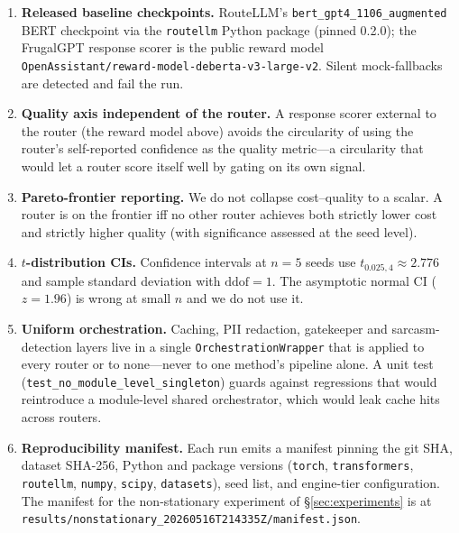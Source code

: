 \documentclass[11pt]{article}
\theoremstyle{definition}
\begin{document}
\begin{enumerate}[leftmargin=*, itemsep=1pt, topsep=2pt]
\item \textbf{Released baseline checkpoints.}
RouteLLM's \texttt{bert\_gpt4\_1106\_augmented} BERT checkpoint via the
\texttt{routellm} Python package (pinned 0.2.0); the FrugalGPT response
scorer is the public reward model
\texttt{OpenAssistant/reward-model-deberta-v3-large-v2}. Silent
mock-fallbacks are detected and fail the run.

\item \textbf{Quality axis independent of the router.}
A response scorer external to the router (the reward model above) avoids
the circularity of using the router's self-reported confidence as the
quality metric---a circularity that would let a router score itself well
by gating on its own signal.

\item \textbf{Pareto-frontier reporting.}
We do not collapse cost--quality to a scalar. A router is on the frontier
iff no other router achieves both strictly lower cost and strictly higher
quality (with significance assessed at the seed level).

\item \textbf{$t$-distribution CIs.}
Confidence intervals at $n{=}5$ seeds use $t_{0.025, 4} \approx 2.776$
and sample standard deviation with $\mathrm{ddof}{=}1$. The
asymptotic normal CI ($z{=}1.96$) is wrong at small $n$ and we do not use
it.

\item \textbf{Uniform orchestration.}
Caching, PII redaction, gatekeeper and sarcasm-detection layers live in a
single \texttt{OrchestrationWrapper} that is applied to every router or
to none---never to one method's pipeline alone. A unit test
(\texttt{test\_no\_module\_level\_singleton}) guards against regressions
that would reintroduce a module-level shared orchestrator, which would
leak cache hits across routers.

\item \textbf{Reproducibility manifest.}
Each run emits a manifest pinning the git SHA, dataset SHA-256, Python
and package versions (\texttt{torch}, \texttt{transformers},
\texttt{routellm}, \texttt{numpy}, \texttt{scipy}, \texttt{datasets}),
seed list, and engine-tier configuration. The manifest for the
non-stationary experiment of \S\ref{sec:experiments} is at
\texttt{results/nonstationary\_20260516T214335Z/manifest.json}.
\end{enumerate}
\end{document}

